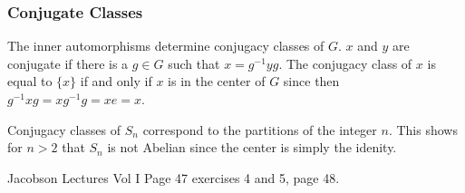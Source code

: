 \documentclass{article}                                                        %
\begin{document}
            \subsubsection{Conjugate Classes}
                The inner automorphisms determine conjugacy classes of $G$.
                $x$ and $y$ are conjugate if there is a $g\in{G}$ such that
                $x=g^{\minus{1}}yg$. The conjugacy class of $x$ is equal to
                $\{x\}$ if and only if $x$ is in the center of $G$ since then
                $g^{\minus{1}}xg=xg^{\minus{1}}g=xe=x$.
                \begin{example}
                    Conjugacy classes of $S_{n}$ correspond to the partitions of
                    the integer $n$. This shows for $n>2$ that $S_{n}$ is not
                    Abelian since the center is simply the idenity.
                \end{example}
                Jacobson Lectures Vol I Page 47 exercises 4 and 5, page 48.
\end{document}
